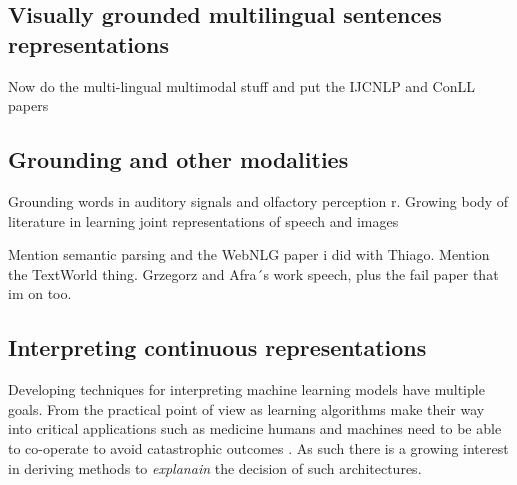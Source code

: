 \subsection{Visually grounded multilingual sentences representations}
Now do the multi-lingual multimodal stuff and put the IJCNLP and ConLL papers

\subsection{Grounding and other modalities}
Grounding words in auditory signals \cite{kiela2015multi,lopopolo2015sound} and olfactory perception \cite{kiela2015grounding}r. Growing body of literature in learning joint representations of speech and images \cite{harwath2016unsupervised,chrupala2017representations,harwath2018jointly}


Mention semantic parsing and the WebNLG paper i did with Thiago. Mention the TextWorld thing. Grzegorz and Afra´s work speech, plus the fail paper that im on too.


\subsection{Interpreting continuous representations}
Developing techniques for interpreting machine learning models have multiple goals. From the practical point of view as learning algorithms
make their way into critical applications such as medicine humans and machines need to be able to co-operate to avoid catastrophic outcomes \cite{caruana2015intelligible}.
As such there is a growing interest in deriving methods to \emph{explanain} the decision of such architectures.

